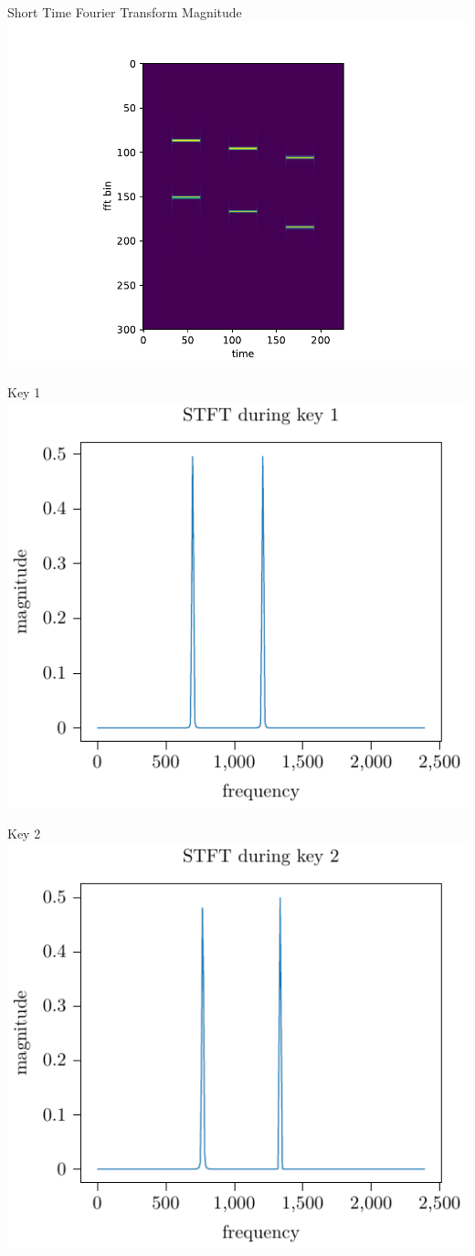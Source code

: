 \documentclass[xcolor=dvipsnames]{beamer}
\begin{document}
\begin{frame}{Short Time Fourier Transform Magnitude}
\centering
\includegraphics[width=0.8\linewidth]{./plots/stft_full.pdf}
\end{frame}

\begin{frame}{Key 1}
\centering
\includegraphics[width=0.5\linewidth]{./plots/stft_key_1.pdf}
\end{frame}

\begin{frame}{Key 2}
\centering
\includegraphics[width=0.5\linewidth]{./plots/stft_key_2.pdf}
\end{frame}
\end{document}
